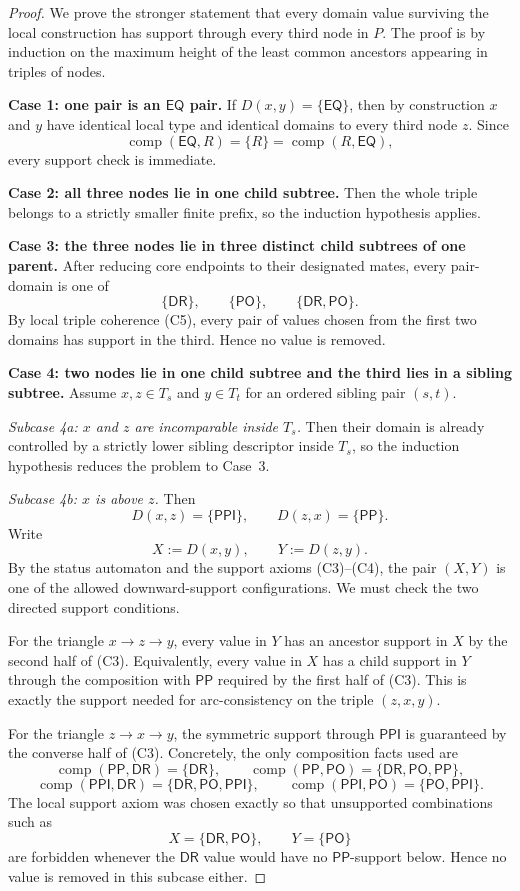 \documentclass[11pt]{article}
\theoremstyle{remark}
\newcommand{\DR}{\mathsf{DR}}
\newcommand{\PO}{\mathsf{PO}}
\newcommand{\PP}{\mathsf{PP}}
\newcommand{\PPI}{\mathsf{PPI}}
\newcommand{\EQ}{\mathsf{EQ}}
\newcommand{\comp}{\operatorname{comp}}
\begin{document}
\begin{proof}
We prove the stronger statement that every domain value surviving the local construction has support through every third node in $P$. The proof is by induction on the maximum height of the least common ancestors appearing in triples of nodes.

\smallskip
\noindent\textbf{Case 1: one pair is an $\EQ$ pair.}
If $D(x,y)=\{\EQ\}$, then by construction $x$ and $y$ have identical local type and identical domains to every third node $z$. Since
\[
\comp(\EQ,R)=\{R\}=\comp(R,\EQ),
\]
every support check is immediate.

\smallskip
\noindent\textbf{Case 2: all three nodes lie in one child subtree.}
Then the whole triple belongs to a strictly smaller finite prefix, so the induction hypothesis applies.

\smallskip
\noindent\textbf{Case 3: the three nodes lie in three distinct child subtrees of one parent.}
After reducing core endpoints to their designated mates, every pair-domain is one of
\[
\{\DR\},\qquad \{\PO\},\qquad \{\DR,\PO\}.
\]
By local triple coherence (C5), every pair of values chosen from the first two domains has support in the third. Hence no value is removed.

\smallskip
\noindent\textbf{Case 4: two nodes lie in one child subtree and the third lies in a sibling subtree.}
Assume $x,z\in T_s$ and $y\in T_t$ for an ordered sibling pair $(s,t)$.

\smallskip
\noindent\emph{Subcase 4a: $x$ and $z$ are incomparable inside $T_s$.}
Then their domain is already controlled by a strictly lower sibling descriptor inside $T_s$, so the induction hypothesis reduces the problem to Case~3.

\smallskip
\noindent\emph{Subcase 4b: $x$ is above $z$.}
Then
\[
D(x,z)=\{\PPI\},\qquad D(z,x)=\{\PP\}.
\]
Write
\[
X:=D(x,y),\qquad Y:=D(z,y).
\]
By the status automaton and the support axioms (C3)--(C4), the pair $(X,Y)$ is one of the allowed downward-support configurations. We must check the two directed support conditions.

For the triangle $x\to z\to y$, every value in $Y$ has an ancestor support in $X$ by the second half of (C3). Equivalently, every value in $X$ has a child support in $Y$ through the composition with $\PP$ required by the first half of (C3). This is exactly the support needed for arc-consistency on the triple $(z,x,y)$.

For the triangle $z\to x\to y$, the symmetric support through $\PPI$ is guaranteed by the converse half of (C3). Concretely, the only composition facts used are
\[
\comp(\PP,\DR)=\{\DR\},\qquad \comp(\PP,\PO)=\{\DR,\PO,\PP\},
\]
\[
\comp(\PPI,\DR)=\{\DR,\PO,\PPI\},\qquad \comp(\PPI,\PO)=\{\PO,\PPI\}.
\]
The local support axiom was chosen exactly so that unsupported combinations such as
\[
X=\{\DR,\PO\},\qquad Y=\{\PO\}
\]
are forbidden whenever the $\DR$ value would have no $\PP$-support below. Hence no value is removed in this subcase either.


\end{proof}
\end{document}
